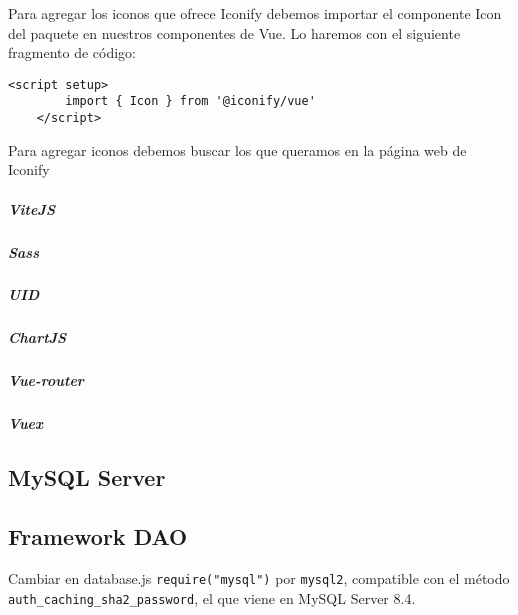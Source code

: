 Para agregar los iconos que ofrece Iconify debemos importar el componente Icon del paquete en nuestros componentes de Vue. Lo haremos con el siguiente fragmento de código:

\begin{lstlisting}[style=Javascript-color, caption={Importar el componente Icon en Vue},label=Javascript_code-color]
	<script setup>
		import { Icon } from '@iconify/vue'
	</script>
\end{lstlisting}

Para agregar iconos debemos buscar los que queramos en la página web de Iconify 


\subparagraph{ViteJS}

\subparagraph{Sass}

\subparagraph{UID}

\subparagraph{ChartJS}

\subparagraph{Vue-router}

\subparagraph{Vuex}


\subsection{MySQL Server}

\subsection{Framework DAO}
Cambiar en database.js \lstinline|require("mysql")| por \lstinline|mysql2|, compatible con el método \lstinline|auth_caching_sha2_password|, el que viene en MySQL Server 8.4.

